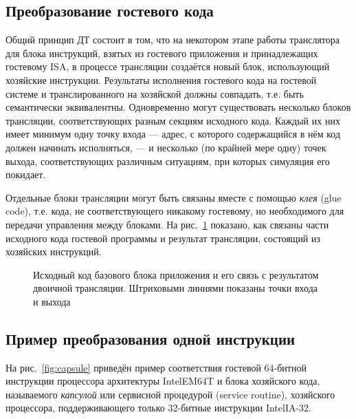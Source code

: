 \subsection{Преобразование гостевого кода}

Общий принцип ДТ состоит в том, что на некотором этапе работы транслятора для блока инструкций, взятых из гостевого приложения и принадлежащих гостевому ISA, в процессе трансляции создаётся новый блок, использующий хозяйские инструкции. Результаты исполнения гостевого кода на гостевой системе и транслированного на хозяйской должны совпадать, т.е. быть семантически эквивалентны. Одновременно могут существовать несколько блоков трансляции, соответствующих разным секциям исходного кода. Каждый их них имеет минимум одну точку входа — адрес, с которого содержащийся в нём код должен начинать исполняться, — и несколько (по крайней мере одну) точек выхода, соответствующих различным ситуациям, при которых симуляция его покидает.

Отдельные блоки трансляции могут быть связаны вместе с помощью \textit{клея} (\abbr glue code), т.е. кода, не соответствующего никакому гостевому, но необходимого для передачи управления между блоками. На рис.~\ref{fig:bb-translation} показано, как связаны части исходного кода гостевой программы и результат трансляции, состоящий из хозяйских инструкций.

\begin{figure}[htb]
    \centering
    \caption[Исходный код и результат трансляции]{Исходный код базового блока приложения и его связь с результатом двоичной трансляции. Штриховыми линиями показаны точки входа и выхода}
    \label{fig:bb-translation}
\end{figure}


\subsection{Пример преобразования одной инструкции}

На рис.~\ref{fig:capsule} приведён пример соответствия гостевой 64-битной инструкции процессора архитектуры Intel\textregistered EM64T и блока хозяйского кода, называемого \textit{капсулой} или сервисной процедурой (\abbr service routine), хозяйского процессора, поддерживающего только 32-битные инструкции Intel\textregistered IA-32. 



